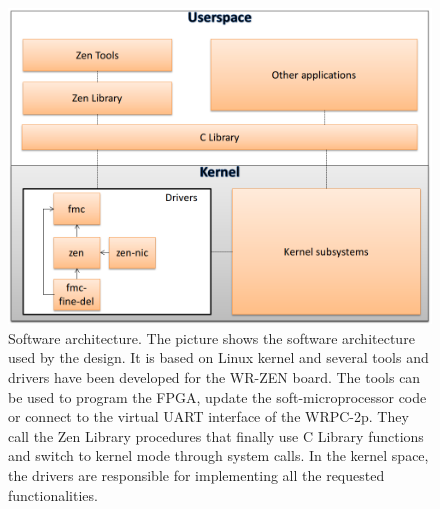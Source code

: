 \begin{figure}[H]
	\centering
	\includegraphics[scale=0.4]{img/software_architecture}
	\caption{Software architecture. The picture shows the software architecture
		used by the design. It is based on Linux kernel and several tools and drivers
		have been developed for the WR-ZEN board. The tools can be used to program 
		the FPGA, update the soft-microprocessor code or connect to the virtual UART
		interface of the WRPC-2p. They call the Zen Library procedures that finally
		use C Library functions and switch to kernel mode through system calls. In the
		kernel space, the drivers are responsible for implementing all the requested 
		functionalities. }
	\label{fig:software_architecture}
\end{figure}
